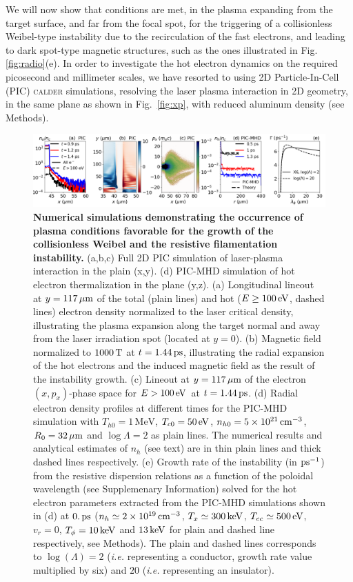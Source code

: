 \documentclass[aps,twocolumn,showpacs,superscriptaddress]{revtex4}
\begin{document}
We will now show that conditions are met, in the plasma  expanding from the target surface, and far from the focal spot, for the triggering of a collisionless Weibel-type instability due to the recirculation of the fast electrons, and leading to dark spot-type magnetic structures, such as the ones illustrated in Fig. \ref{fig:radio}(e). 
In order to investigate the hot electron dynamics on the required picosecond and millimeter scales, we have resorted to using 2D Particle-In-Cell (PIC) \textsc{calder} \cite{NF_Lefebvre_2003} simulations, resolving the laser plasma interaction in 2D geometry, in the same plane as shown in Fig.~\ref{fig:xp},  with reduced aluminum density (see Methods).
%
\begin{figure}[tbh!]
\includegraphics[scale=0.4]{figure_3.png}
\caption{\label{fig:pic} 
\textbf{Numerical simulations demonstrating the occurrence of plasma conditions favorable for the growth of the collisionless Weibel and the resistive filamentation instability. }
(a,b,c) Full 2D PIC simulation of  laser-plasma interaction in the plain (x,y).
(d) PIC-MHD simulation of hot electron thermalization in the plane (y,z).
(a)  Longitudinal lineout at $y=117\,\rm \mu m$ of the total (plain lines) and hot ($E\ge 100\,\rm eV$, dashed lines) electron density normalized to the laser critical density, illustrating the plasma expansion along the target normal and away from the laser irradiation spot (located at $y=0$).  
(b) Magnetic field   normalized to $1000\,\rm T$ at $t =1.44\,\rm ps$, illustrating the radial expansion of the hot electrons and the induced magnetic field as the result of the instability growth.
(c) Lineout at $y = 117\,\rm \mu m$ of the electron $(x,p_x)$-phase space for $E>100\,\rm eV$  at $t =1.44\,\rm ps$. 
(d) Radial electron density profiles at different times  for the PIC-MHD simulation with $T_{h0} = 1\,\mathrm{MeV}$, $T_{c0} = 50\,\rm eV$, $n_{h0} = 5 \times 10^{21}\,\rm cm^{-3}$, $R_0 = 32\,\rm \mu m$ and $\log \Lambda =2$ as plain lines. The numerical results and analytical  estimates of $n_h$ (see text) are in thin plain lines and thick dashed lines respectively.
(e) Growth  rate of the instability (in $\rm ps^{-1}$) from the  resistive dispersion relations as a function of the poloidal wavelength (see Supplemenary Information) solved for the hot electron parameters extracted from the PIC-MHD simulations shown in (d) at $0.\,\rm ps$ ($n_h \simeq 2\times 10^{19}\,\rm cm^{-3}$,  $T_{x} \simeq 300\,\rm keV$, $T_{ec} \simeq 500\,\rm eV$, $v_r=0$,  $T_\phi = 10\,\rm keV$ and $13\,\rm keV$ for plain  and dashed line respectively, see Methods). 
The plain and dashed lines corresponds to $\log(\Lambda)=2$ (\emph{i.e.} representing a conductor, growth rate value multiplied by six) and $20$ (\emph{i.e.} representing an insulator). 
}
\end{figure}
\end{document}

